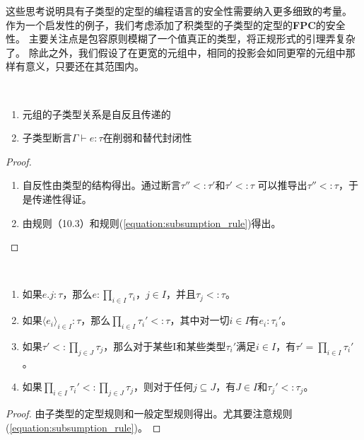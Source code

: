 这些思考说明具有子类型的定型的编程语言的安全性需要纳入更多细致的考量。
作为一个启发性的例子，我们考虑添加了积类型的子类型的定型的\textbf{FPC}的安全性。
主要关注点是包容原则模糊了一个值真正的类型，将正规形式的引理弄复杂了。
除此之外，我们假设了在更宽的元组中，相同的投影会如同更窄的元组中那样有意义，只要还在其范围内。
\begin{lemma}[结构性]
    ~
    \begin{enumerate}
    \item 元组的子类型关系是自反且传递的
    \item 子类型断言$\Gamma\vdash e:\tau$在削弱和替代封闭性
    \end{enumerate}
\end{lemma}
\begin{proof}
    ~
    \begin{enumerate}
        \item 自反性由类型的结构得出。通过断言$\tau''<:\tau'$和$\tau'<:\tau$
        可以推导出$\tau''<:\tau$，于是传递性得证。
        \item 由规则（10.3）和规则(\ref{equation:subsumption_rule})得出。
    \end{enumerate}
\end{proof}
\begin{lemma}[反转性]\label{lemma:inversion}
    ~
    \begin{enumerate}
        \item 如果$e.j:\tau$，那么$e:\prod_{i\in I}\tau_i$，$j\in I$，并且$\tau_j<:\tau$。
        \item 如果$\langle e_i\rangle_{i\in I}:\tau$，那么$\prod_{i\in I}\tau_i'<:\tau$，其中对一切$i\in I$有$e_i:\tau_i'$。
        \item 如果$\tau'<:\prod_{j\in J}\tau_j$，那么对于某些I和某些类型$\tau_i'$满足$i\in I$，有$\tau'=\prod_{i\in I}\tau_i'$。
        \item 如果$\prod_{i\in I}\tau_i'<:\prod_{j\in J}\tau_j$，则对于任何$j\subseteq J$，有$J\in I$和$\tau_j'<:\tau_j$。
    \end{enumerate}
\end{lemma}
\begin{proof}
    由子类型的定型规则和一般定型规则得出。尤其要注意规则(\ref{equation:subsumption_rule})。
\end{proof}


